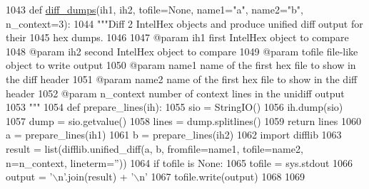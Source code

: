 \begin{DoxyCode}
1043 \textcolor{keyword}{def }\hyperlink{namespacesoftware_1_1chipwhisperer_1_1capture_1_1utils_1_1IntelHex_afa890dbf7e4859c72161a82cbd94e943}{diff\_dumps}(ih1, ih2, tofile=None, name1="a", name2="b", n\_context=3):
1044     \textcolor{stringliteral}{"""Diff 2 IntelHex objects and produce unified diff output for their}
1045 \textcolor{stringliteral}{    hex dumps.}
1046 \textcolor{stringliteral}{}
1047 \textcolor{stringliteral}{    @param ih1        first IntelHex object to compare}
1048 \textcolor{stringliteral}{    @param ih2        second IntelHex object to compare}
1049 \textcolor{stringliteral}{    @param tofile     file-like object to write output}
1050 \textcolor{stringliteral}{    @param name1      name of the first hex file to show in the diff header}
1051 \textcolor{stringliteral}{    @param name2      name of the first hex file to show in the diff header}
1052 \textcolor{stringliteral}{    @param n\_context  number of context lines in the unidiff output}
1053 \textcolor{stringliteral}{    """}
1054     \textcolor{keyword}{def }prepare\_lines(ih):
1055         sio = StringIO()
1056         ih.dump(sio)
1057         dump = sio.getvalue()
1058         lines = dump.splitlines()
1059         \textcolor{keywordflow}{return} lines
1060     a = prepare\_lines(ih1)
1061     b = prepare\_lines(ih2)
1062     \textcolor{keyword}{import} difflib
1063     result = list(difflib.unified\_diff(a, b, fromfile=name1, tofile=name2, n=n\_context, lineterm=\textcolor{stringliteral}{''}))
1064     \textcolor{keywordflow}{if} tofile \textcolor{keywordflow}{is} \textcolor{keywordtype}{None}:
1065         tofile = sys.stdout
1066     output = \textcolor{stringliteral}{'\(\backslash\)n'}.join(result) + \textcolor{stringliteral}{'\(\backslash\)n'}
1067     tofile.write(output)
1068 
1069 
\end{DoxyCode}
\hypertarget{namespacesoftware_1_1chipwhisperer_1_1capture_1_1utils_1_1IntelHex_a31dcca6708e9e8c86d669f3a4ea17b22}{}
